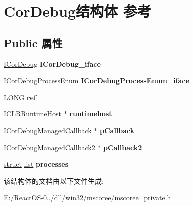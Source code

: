 \hypertarget{struct_cor_debug}{}\section{Cor\+Debug结构体 参考}
\label{struct_cor_debug}
\subsection*{Public 属性}
\begin{DoxyCompactItemize}
\item 
\mbox{\label{struct_cor_debug_a705a22882bcd6e39f580fe880e313dbc}} 
\hyperlink{interface_i_cor_debug}{I\+Cor\+Debug} {\bfseries I\+Cor\+Debug\+\_\+iface}
\item 
\mbox{\label{struct_cor_debug_a1296b2ce46b8a7d2cd6ac0e70f0febf8}} 
\hyperlink{interface_i_cor_debug_process_enum}{I\+Cor\+Debug\+Process\+Enum} {\bfseries I\+Cor\+Debug\+Process\+Enum\+\_\+iface}
\item 
\mbox{\label{struct_cor_debug_a0aeb057d262fdfddc2f2d0b75f900a37}} 
L\+O\+NG {\bfseries ref}
\item 
\mbox{\label{struct_cor_debug_a510d480b27319b0af4be4a9c615ddb3c}} 
\hyperlink{interface_i_c_l_r_runtime_host}{I\+C\+L\+R\+Runtime\+Host} $\ast$ {\bfseries runtimehost}
\item 
\mbox{\label{struct_cor_debug_a3cd80327d4d00aacdf9cff52f416ea56}} 
\hyperlink{interface_i_cor_debug_managed_callback}{I\+Cor\+Debug\+Managed\+Callback} $\ast$ {\bfseries p\+Callback}
\item 
\mbox{\label{struct_cor_debug_ae3779a4c639253ebea05c73b9b1873d2}} 
\hyperlink{interface_i_cor_debug_managed_callback2}{I\+Cor\+Debug\+Managed\+Callback2} $\ast$ {\bfseries p\+Callback2}
\item 
\mbox{\label{struct_cor_debug_a1b09c1f7f2ded65217a914bcde885602}} 
\hyperlink{interfacestruct}{struct} \hyperlink{classlist}{list} {\bfseries processes}
\end{DoxyCompactItemize}


该结构体的文档由以下文件生成\+:\begin{DoxyCompactItemize}
\item 
E\+:/\+React\+O\+S-\/0../dll/win32/mscoree/mscoree\+\_\+private.\+h\end{DoxyCompactItemize}
